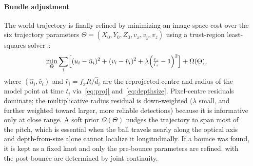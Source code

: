 \documentclass[journal]{IEEEtran}
\begin{document}
\paragraph*{Bundle adjustment} The world trajectory is finally refined by
minimizing an image-space cost over the six trajectory parameters
$\Theta=(X_0,Y_0,Z_0,v_x,v_y,v_z)$ using a trust-region least-squares
solver~\cite{more1978lm,virtanen2020scipy}:
\begin{equation}
\min_{\Theta}\sum_i \Bigl[(u_i-\hat u_i)^2+(v_i-\hat v_i)^2
+\lambda\Bigl(\tfrac{r_i}{\hat r_i}-1\Bigr)^2\Bigr]+\Omega(\Theta),
\label{eq:ba}
\end{equation}
where $(\hat u_i,\hat v_i)$ and $\hat r_i=f_xR/\hat d_i$ are the reprojected
centre and radius of the model point at time $t_i$ via~\eqref{eq:proj}
and~\eqref{eq:depthsize}. Pixel-centre residuals dominate; the multiplicative
radius residual is down-weighted ($\lambda$ small, and further weighted toward
larger, more reliable detections) because it is informative only at close
range. A soft prior $\Omega(\Theta)$ nudges the trajectory to span most of the
pitch, which is essential when the ball travels nearly along the optical axis
and depth-from-size alone cannot localize it longitudinally. If a bounce was
found, it is kept as a fixed knot and only the pre-bounce parameters are
refined, with the post-bounce arc determined by joint continuity.
\end{document}
